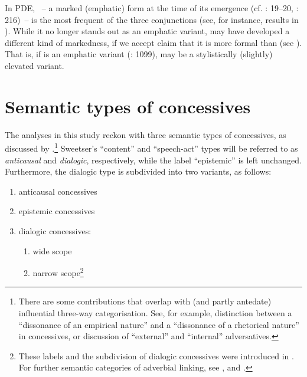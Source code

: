 In PDE, ~– a marked (emphatic) form at the time of its emergence (cf. \citealt{Burnham1911}: 19–20, \citealt{Bryant1962}: 216)~– is the most frequent of the three conjunctions (see, for instance, results in \citealt{Schützler2017}). While it no longer stands out as an emphatic variant,  may have developed a different kind of markedness, if we accept  claim that it is more formal than  (see ). That is, if  is an emphatic variant (\citealt{QuirkEtAl1985}: 1099),  may be a stylistically (slightly) elevated variant.

\section{\label{bkm:Ref431556473}\label{bkm:Ref425763480}Semantic types of concessives}\label{sec:2.2}

The analyses in this study reckon with three semantic types of concessives, as discussed by \citet[76–78]{Sweetser1990}.\footnote{There are some contributions that overlap with (and partly antedate)  influential three-way categorisation. See, for example,  distinction between a “dissonance of an empirical nature” and a “dissonance of a rhetorical nature” in concessives, or  discussion of “external” and “internal” adversatives.} Sweetser's “content” and “speech-act” types will be referred to as \textit{anticausal} and \textit{dialogic}, respectively, while the label “epistemic” is left unchanged. Furthermore, the dialogic type is subdivided into two variants, as follows:

\begin{enumerate}
\item {}anticausal concessives
\item {}epistemic concessives
\item {}dialogic concessives:
  \begin{enumerate}
  \item {}wide scope
  \item {}narrow scope\footnote{These labels and the subdivision of dialogic concessives were introduced in \citet{Schützler2020b}. For further semantic categories of adverbial linking, see \citet[315–317]{Crevels2000}, \citet{Lang2000} and \citet{Tsunoda2012}.}
  \end{enumerate}
\end{enumerate}

